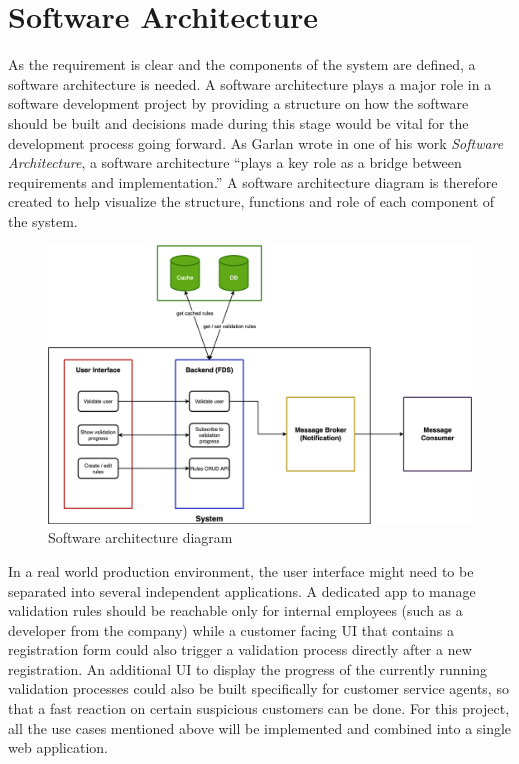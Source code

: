 \section{Software Architecture}
 \label{section:sw-arc}

As the requirement is clear and the components of the system are defined, a software architecture is needed. A software architecture plays a major role in a software development project by providing a structure on how the software should be built and decisions made during this stage would be vital for the development process going forward. As Garlan wrote in one of his work \emph{Software Architecture}, a software architecture \enquote{plays a key role as a bridge between requirements and implementation.}\autocite{garlan-2000} A software architecture diagram is therefore created to help visualize the structure, functions and role of each component of the system.

\begin{figure}[h]
 \includegraphics[width=\textwidth]{diagrams/sw-architecture.png}
 \caption{Software architecture diagram}
 \label{fig:sw-arc}
\end{figure}

In a real world production environment, the user interface might need to be separated into several independent applications. A dedicated app to manage validation rules should be reachable only for internal employees (such as a developer from the company) while a customer facing UI that contains a registration form could also trigger a validation process directly after a new registration. An additional UI to display the progress of the currently running validation processes could also be built specifically for customer service agents, so that a fast reaction on certain suspicious customers can be done. For this project, all the use cases mentioned above will be implemented and combined into a single web application. 

